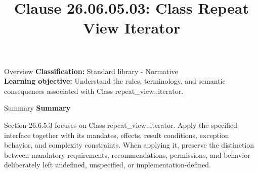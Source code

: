 \documentclass[10pt,letterpaper]{article}
\title{Clause 26.06.05.03: Class Repeat View Iterator}
\author{}
\date{}
\begin{document}
\maketitle
\begin{CornellOverviewBox}{Overview}
\textbf{Classification:} Standard library - Normative\\[2pt]
\textbf{Learning objective:} Understand the rules, terminology, and semantic consequences associated with Class repeat\_view::iterator.
\end{CornellOverviewBox}\begin{CornellSummaryBox}{Summary}
{\sffamily\bfseries\color{Accent} Summary}\par\vspace{3pt}Section 26.6.5.3 focuses on Class repeat\_view::iterator. Apply the specified interface together with its mandates, effects, result conditions, exception behavior, and complexity constraints. When applying it, preserve the distinction between mandatory requirements, recommendations, permissions, and behavior deliberately left undefined, unspecified, or implementation-defined.
\end{CornellSummaryBox}
\end{document}

